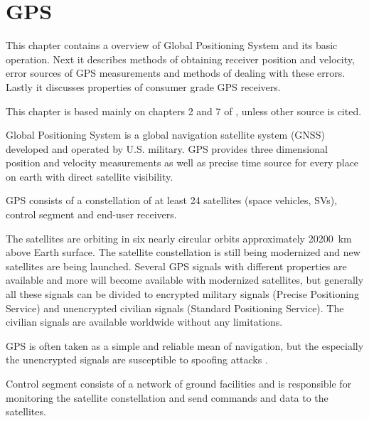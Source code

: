 \chapter{GPS}
\label{chap:gps}

This chapter contains a overview of Global Positioning System and
its basic operation.
Next it describes methods of obtaining receiver position and velocity,
error sources of GPS measurements and methods of dealing with these errors.
Lastly it discusses properties of consumer grade GPS receivers.

This chapter is based mainly on chapters 2 and 7 of \cite{kaplan06}, unless other source is cited.

Global Positioning System is a global navigation satellite system (GNSS)
developed and operated by U.S. military.
GPS provides three dimensional position and velocity measurements as well as
precise time source for every place on earth with direct satellite visibility.

GPS consists of a constellation of at least 24 satellites (space vehicles, SVs),
control segment and end-user receivers.

The satellites are orbiting in six nearly circular orbits approximately \SI{20200}{km}
above Earth surface.
The satellite constellation is still being modernized \cite{gps-modernization-www}
and new satellites are being launched.
Several GPS signals with different properties are available and more will become available
with modernized satellites,
but generally all these signals can be divided to encrypted military signals 
(Precise Positioning Service) and unencrypted
civilian signals (Standard Positioning Service).
The civilian signals are available worldwide without any limitations.


GPS is often taken as a simple and reliable mean of navigation,
but the especially the unencrypted signals are susceptible to spoofing attacks \cite{tippenhauer11}.


Control segment consists of a network of ground facilities and is responsible for
monitoring the satellite constellation and send commands and data to the satellites.



